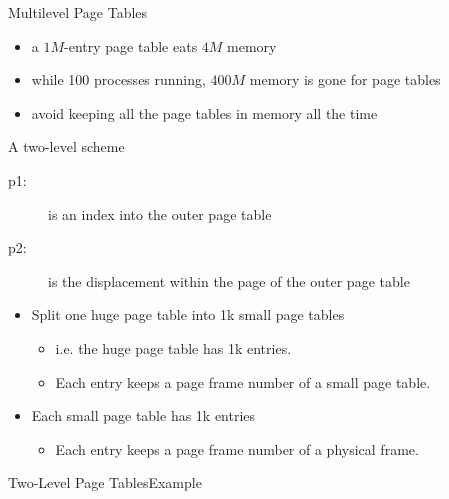 \begin{frame}{Multilevel Page Tables}
  \begin{itemize}
  \item a $1M$-entry page table eats $4M$ memory
  \item while 100 processes running, $400M$ memory is gone for page tables
  \item avoid keeping all the page tables in memory all the time
  \end{itemize}
  \begin{iblock}{A two-level scheme}
    \begin{center}
    \end{center}
  \end{iblock}
\end{frame}

\begin{description}
\item[p1:] is an index into the outer page table
\item[p2:] is the displacement within the page of the outer page table
\end{description}

\begin{itemize}
\item Split one huge page table into 1k small page tables
  \begin{itemize}
  \item i.e. the huge page table has 1k entries.
  \item Each entry keeps a page frame number of a small page table.
  \end{itemize}
\item Each small page table has 1k entries
  \begin{itemize}
  \item Each entry keeps a page frame number of a physical frame.
  \end{itemize}
\end{itemize}

\begin{frame}{Two-Level Page Tables}{Example}
  \centering
  \mode<beamer>{ \texttt{[image: 2-level-paging-2]} }%
\end{frame}

